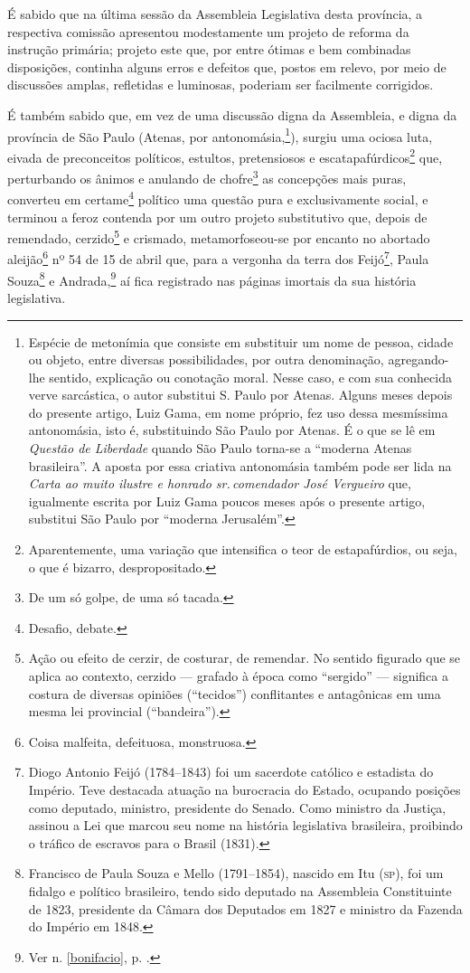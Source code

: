 É sabido que na última sessão da Assembleia Legislativa desta província,
a respectiva comissão apresentou modestamente um projeto de reforma da
instrução primária; projeto este que, por entre ótimas e bem combinadas
disposições, continha alguns erros e defeitos que, postos em relevo, por
meio de discussões amplas, refletidas e luminosas, poderiam ser
facilmente corrigidos.

É também sabido que, em vez de uma discussão digna da Assembleia, e
digna da província de São Paulo (Atenas, por antonomásia,\footnote{
  Espécie de metonímia que consiste em substituir um nome de pessoa,
  cidade ou objeto, entre diversas possibilidades, por outra
  denominação, agregando-lhe sentido, explicação ou conotação moral.
  Nesse caso, e com sua conhecida verve sarcástica, o autor substitui S.
  Paulo por Atenas. Alguns meses depois do presente artigo, Luiz Gama,
  em nome próprio, fez uso dessa mesmíssima antonomásia, isto é,
  substituindo São Paulo por Atenas. É o que se lê em \emph{Questão de
  Liberdade} quando São Paulo torna-se a ``moderna Atenas brasileira''. A
  aposta por essa criativa antonomásia também pode ser lida na
  \emph{Carta ao muito ilustre e honrado sr.\,comendador José Vergueiro}
  que, igualmente escrita por Luiz Gama poucos meses após o presente
  artigo, substitui São Paulo por ``moderna Jerusalém''.}), surgiu uma
ociosa luta, eivada de preconceitos políticos, estultos, pretensiosos e
escatapafúrdicos\footnote{Aparentemente, uma variação que intensifica
  o teor de estapafúrdios, ou seja, o que é bizarro, despropositado.}
que, perturbando os ânimos e anulando de chofre\footnote{De um só
  golpe, de uma só tacada.} as concepções mais puras, converteu em
certame\footnote{Desafio, debate.} político uma questão pura e
exclusivamente social, e terminou a feroz contenda por um outro projeto
substitutivo que, depois de remendado, cerzido\footnote{Ação ou efeito
  de cerzir, de costurar, de remendar. No sentido figurado que se aplica
  ao contexto, cerzido --- grafado à época como ``sergido'' --- significa a
  costura de diversas opiniões (``tecidos'') conflitantes e antagônicas em
  uma mesma lei provincial (``bandeira'').} e crismado, metamorfoseou-se
por encanto no abortado aleijão\footnote{Coisa malfeita, defeituosa,
  monstruosa.} nº 54 de 15 de abril que, para a vergonha da terra dos
Feijó\footnote{Diogo Antonio Feijó (1784--1843) foi um sacerdote
  católico e estadista do Império. Teve destacada atuação na burocracia
  do Estado, ocupando posições como deputado, ministro, presidente do
  Senado. Como ministro da Justiça, assinou a Lei que marcou seu nome na
  história legislativa brasileira, proibindo o tráfico de escravos para
  o Brasil (1831).}, Paula Souza\footnote{Francisco de Paula Souza e
  Mello (1791--1854), nascido em Itu (\textsc{sp}), foi um fidalgo e político
  brasileiro, tendo sido deputado na Assembleia Constituinte de 1823,
  presidente da Câmara dos Deputados em 1827 e ministro da Fazenda do
  Império em 1848.} e Andrada,\footnote{Ver n. \ref{bonifacio}, p. \pageref{bonifacio}.} 
  aí fica registrado nas páginas imortais da sua história legislativa.

